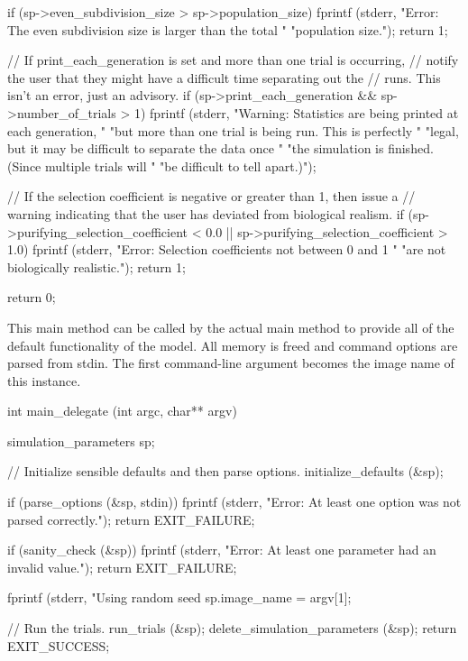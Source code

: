 \documentclass{article}
\begin{document}
\begin{ccode}
{{    if (sp->even_subdivision_size > sp->population_size) {
      fprintf (stderr, "Error: The even subdivision size is larger than the total "
                   "population size.\n");
      return 1;
    }
  }

  // If print_each_generation is set and more than one trial is occurring,
  // notify the user that they might have a difficult time separating out the
  // runs. This isn't an error, just an advisory.
  if (sp->print_each_generation && sp->number_of_trials > 1)
    fprintf (stderr, "Warning: Statistics are being printed at each generation, "
                 "but more than one trial is being run. This is perfectly "
                 "legal, but it may be difficult to separate the data once "
                 "the simulation is finished. (Since multiple trials will "
                 "be difficult to tell apart.)\n");

  // If the selection coefficient is negative or greater than 1, then issue a
  // warning indicating that the user has deviated from biological realism.
  if (sp->purifying_selection_coefficient < 0.0 ||
      sp->purifying_selection_coefficient > 1.0) {
    fprintf (stderr, "Error: Selection coefficients not between 0 and 1 "
                 "are not biologically realistic.\n");
    return 1;
  }

  return 0;
}
\end{ccode}

     This main method can be called by the actual main method to provide all of
     the default functionality of the model. All memory is freed and command
     options are parsed from stdin. The first command-line argument becomes the
     image name of this instance.

\begin{ccode}
int main_delegate (int argc, char** argv) {
  simulation_parameters sp;

  // Initialize sensible defaults and then parse options.
  initialize_defaults (&sp);

  if (parse_options (&sp, stdin)) {
    fprintf (stderr, "Error: At least one option was not parsed correctly.\n");
    return EXIT_FAILURE;
  }

  if (sanity_check (&sp)) {
    fprintf (stderr, "Error: At least one parameter had an invalid value.\n");
    return EXIT_FAILURE;
  }

  fprintf (stderr, "Using random seed %
  sp.image_name = argv[1];

  // Run the trials.
  run_trials (&sp);
  delete_simulation_parameters (&sp);
  return EXIT_SUCCESS;
}
\end{ccode}
\end{document}
